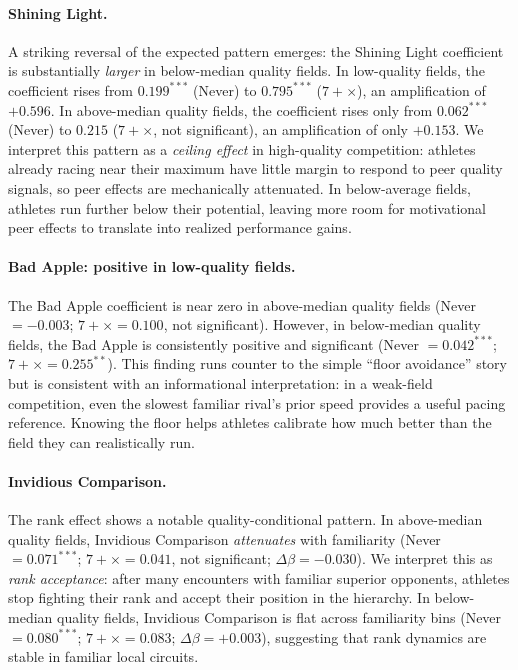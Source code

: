 \documentclass[12pt]{article}
\theoremstyle{definition}
\theoremstyle{remark}
\begin{document}
\paragraph{Shining Light.}
A striking reversal of the expected pattern emerges: the Shining Light
coefficient is substantially \textit{larger} in below-median quality fields.
In low-quality fields, the coefficient rises from $0.199^{***}$ (Never) to
$0.795^{***}$ ($7+\times$), an amplification of $+0.596$.
In above-median quality fields, the coefficient rises only from $0.062^{***}$
(Never) to $0.215$ ($7+\times$, not significant), an amplification of only
$+0.153$.
We interpret this pattern as a \textit{ceiling effect} in high-quality competition:
athletes already racing near their maximum have little margin to respond
to peer quality signals, so peer effects are mechanically attenuated.
In below-average fields, athletes run further below their potential, leaving
more room for motivational peer effects to translate into realized performance gains.

\paragraph{Bad Apple: positive in low-quality fields.}
The Bad Apple coefficient is near zero in above-median quality fields
(Never $= -0.003$; $7+\times = 0.100$, not significant).
However, in below-median quality fields, the Bad Apple is consistently positive
and significant (Never $= 0.042^{***}$; $7+\times = 0.255^{**}$).
This finding runs counter to the simple ``floor avoidance'' story but is
consistent with an informational interpretation: in a weak-field competition,
even the slowest familiar rival's prior speed provides a useful pacing reference.
Knowing the floor helps athletes calibrate how much better than the field they
can realistically run.

\paragraph{Invidious Comparison.}
The rank effect shows a notable quality-conditional pattern.
In above-median quality fields, Invidious Comparison \textit{attenuates}
with familiarity (Never $= 0.071^{***}$; $7+\times = 0.041$, not significant;
$\Delta\beta = -0.030$).
We interpret this as \textit{rank acceptance}: after many encounters with familiar
superior opponents, athletes stop fighting their rank and accept their position
in the hierarchy.
In below-median quality fields, Invidious Comparison is flat across familiarity
bins (Never $= 0.080^{***}$; $7+\times = 0.083$; $\Delta\beta = +0.003$),
suggesting that rank dynamics are stable in familiar local circuits.
\end{document}
